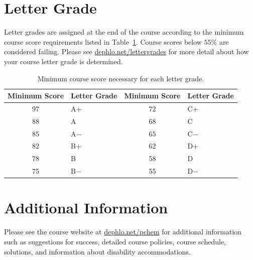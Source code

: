 \documentclass[letterpaper,oneside,onecolumn,11pt,article]{memoir}
\begin{document}
\section{Letter Grade}
Letter grades are assigned at the end of the course according to the minimum course score requirements listed in Table~\ref{tab:lettergrades}. Course scores below $55\%$ are considered failing. Please see \href{http://dephlo.net/lettergrades}{dephlo.net/lettergrades} for more detail about how your course letter grade is determined. 

\begin{table}[h]
\caption{\sffamily Minimum course score necessary for each letter grade.}
\label{tab:lettergrades}
\begin{tabular}{cl||cl} \toprule
\textbf{Minimum Score} & \textbf{Letter Grade} & \textbf{Minimum Score} & \textbf{Letter Grade} \\ \hline
97 & \hspace{0.3in}A$+$ & 72 & \hspace{0.3in}C$+$ \\
88 & \hspace{0.3in}A & 68 & \hspace{0.3in}C \\
85 & \hspace{0.3in}A$-$ & 65 & \hspace{0.3in}C$-$ \\
82 & \hspace{0.3in}B$+$ & 62 & \hspace{0.3in}D$+$ \\
78 & \hspace{0.3in}B & 58 & \hspace{0.3in}D \\
75 & \hspace{0.3in}B$-$ & 55 & \hspace{0.3in}D$-$ \\
\bottomrule
\end{tabular}
\end{table}

\section{Additional Information}

Please see the course website at \href{http://dephlo.net/pchem}{dephlo.net/pchem} for additional information such as suggestions for success, detailed course policies, course schedule, solutions, and information about disability accommodations. 
\end{document}
